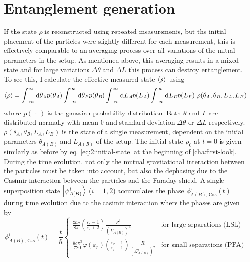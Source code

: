 \section{Entanglement generation}\label{sec:4:entanglement-generation}
If the state $\rho$ is reconstructed using repeated measurements, but the initial placement of the particles were slightly different for each measurement, this is effectively comparable to an averaging process over all variations of the initial parameters in the setup.
As mentioned above, this averaging results in a mixed state and for large variations $\Delta \theta$ and $\Delta L$ this process can destroy entanglement.
To see this, I calculate the effective measured state $\left\langle\rho\right\rangle$ using
\begin{equation}\label{eq:4:average-density}
  \left\langle\rho\right\rangle = \int_{-\infty}^{\infty} \dd \theta_A p(\theta_A) \int_{-\infty}^{\infty} \dd \theta_B p(\theta_B) \int_{-\infty}^{\infty} \dd L_A p(L_A) \int_{-\infty}^{\infty} \dd L_B p(L_B) \ \rho(\theta_A, \theta_B, L_A, L_B)
\end{equation} 
where $p(\,\cdot\,)$ is the gaussian probability distribution. Both $\theta$ and $L$ are distributed normally with mean $0$ and standard deviation $\Delta \theta$ or $\Delta L$ respectively. $\rho(\theta_A, \theta_B, L_A, L_B)$ is the state of a single measurement, dependent on the initial parameters $\theta_{A(B)}$ and $L_{A(B)}$ of the setup.
The initial state $\rho_0$ at $t=0$ is given similarly as before by eq. \eqref{eq:2:initial-state} at the beginning of \cref{cha:first-look}.
During the time evolution, not only the mutual gravitational interaction between the particles must be taken into account, but also the dephasing due to the Casimir interaction between the particles and the Faraday shield.
A single superposition state $\ket{\psi^i_{A(B)}}$ ($i = 1, 2$) accumulates the phase $\phi^i_{A(B),\,\mathrm{Cas}}(t)$ during time evolution due to the casimir interaction where the phases are given by
\begin{equation}
  \phi^i_{A(B),\,\mathrm{Cas}}(t) = \frac{t}{\hbar}
  \begin{cases}
     \frac{3 \hbar c}{8 \pi} \left(\frac{\varepsilon_r - 1}{\varepsilon_r + 2}\right) \frac{R^3}{(L^i_{A(B)})^4} & \text{for large separations (LSL)} \\
    \frac{\hbar c \pi^3}{720} \varphi(\varepsilon_r) \left(\frac{\varepsilon_r - 1}{\varepsilon_r + 1}\right) \frac{R}{(\mathscr{L}^i_{A(B)})^2} & \text{for small separations (PFA)}
  \end{cases}
\end{equation}
